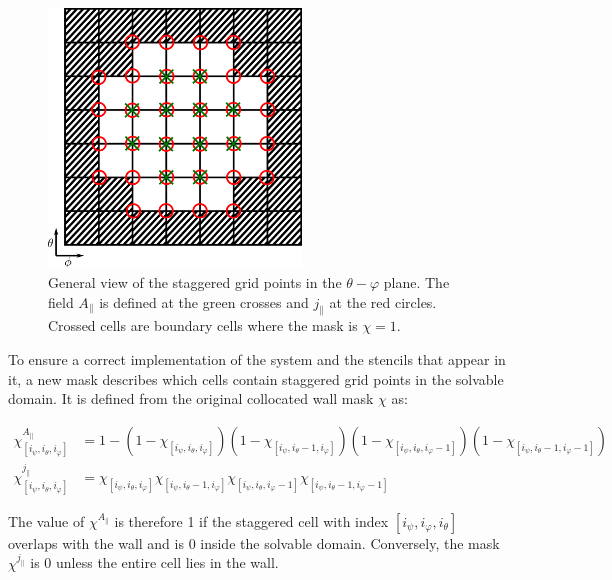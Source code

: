 \begin{figure}[H]
	\centering
	\includegraphics[width=0.6\textwidth]{schemes/staggeredGridBoundary.png}
	\caption[General view of the staggered grid points in the $\theta-\varphi$ plane]{General view of the staggered grid points in the $\theta-\varphi$ plane. The field $A_\parallel$ is defined at the green crosses and $j_\parallel$ at the red circles. Crossed cells are boundary cells where the mask is $\chi = 1$. }
	\label{fig:StaggeredGridBC}
\end{figure}

To ensure a correct implementation of the system and the stencils that appear in it, a new mask describes which cells contain staggered grid points in the solvable domain. It is defined from the original collocated wall mask $\chi$ as:

\begin{align}
	\label{eq:def_chi_staggered}
	\chi^{A_\parallel}_{[i_\psi,i_\theta, i_\varphi]} &= 1 - 
	(1 - \chi_{[i_\psi,i_\theta  ,i_\varphi  ]})
	(1 - \chi_{[i_\psi,i_\theta-1,i_\varphi  ]})
	(1 - \chi_{[i_\psi,i_\theta  ,i_\varphi-1]})
	(1 - \chi_{[i_\psi,i_\theta-1,i_\varphi-1]}) \\
	\chi^{j_\parallel}_{[i_\psi,i_\theta, i_\varphi]} &= 
	\chi_{[i_\psi,i_\theta  ,i_\varphi  ]}
	\chi_{[i_\psi,i_\theta-1,i_\varphi  ]}
	\chi_{[i_\psi,i_\theta  ,i_\varphi-1]}
	\chi_{[i_\psi,i_\theta-1,i_\varphi-1]}
\end{align}

The value of $\chi^{A_\parallel}$ is therefore 1 if the staggered cell with index $[i_\psi,i_\varphi,i_\theta]$ overlaps with the wall and is 0 inside the solvable domain. Conversely, the mask $\chi^{j_\parallel}$ is 0 unless the entire cell lies in the wall. 


